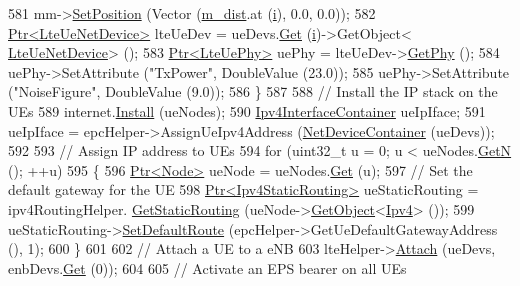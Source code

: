 \begin{DoxyCode}
581       mm->\hyperlink{classns3_1_1MobilityModel_ac584b3d5a309709d2f13ed6ada1e7640}{SetPosition} (Vector (\hyperlink{classLenaTdTbfqFfMacSchedulerTestCase2_a5b82eb9b2d7b4ce7b16fa4b9f4d67bba}{m\_dist}.at (\hyperlink{bernuolliDistribution_8m_a6f6ccfcf58b31cb6412107d9d5281426}{i}), 0.0, 0.0));
582       \hyperlink{classns3_1_1Ptr}{Ptr<LteUeNetDevice>} lteUeDev = ueDevs.\hyperlink{classns3_1_1NetDeviceContainer_a677d62594b5c9d2dea155cc5045f4d0b}{Get} (\hyperlink{bernuolliDistribution_8m_a6f6ccfcf58b31cb6412107d9d5281426}{i})->GetObject<
      \hyperlink{classns3_1_1LteUeNetDevice}{LteUeNetDevice}> ();
583       \hyperlink{classns3_1_1Ptr}{Ptr<LteUePhy>} uePhy = lteUeDev->\hyperlink{classns3_1_1LteUeNetDevice_a2a9940a1e457a8bf3dae87fed4199c7a}{GetPhy} ();
584       uePhy->SetAttribute (\textcolor{stringliteral}{"TxPower"}, DoubleValue (23.0));
585       uePhy->SetAttribute (\textcolor{stringliteral}{"NoiseFigure"}, DoubleValue (9.0));
586     \}
587 
588   \textcolor{comment}{// Install the IP stack on the UEs}
589   internet.\hyperlink{classns3_1_1InternetStackHelper_a6645b412f31283d2d9bc3d8a95cebbc0}{Install} (ueNodes);
590   \hyperlink{classns3_1_1Ipv4InterfaceContainer}{Ipv4InterfaceContainer} ueIpIface;
591   ueIpIface = epcHelper->AssignUeIpv4Address (\hyperlink{classns3_1_1NetDeviceContainer}{NetDeviceContainer} (ueDevs));
592 
593   \textcolor{comment}{// Assign IP address to UEs}
594   \textcolor{keywordflow}{for} (uint32\_t u = 0; u < ueNodes.\hyperlink{classns3_1_1NodeContainer_aed647ac56d0407a7706aba02eb44b951}{GetN} (); ++u)
595     \{
596       \hyperlink{classns3_1_1Ptr}{Ptr<Node>} ueNode = ueNodes.\hyperlink{classns3_1_1NodeContainer_a9ed96e2ecc22e0f5a3d4842eb9bf90bf}{Get} (u);
597       \textcolor{comment}{// Set the default gateway for the UE}
598       \hyperlink{classns3_1_1Ptr}{Ptr<Ipv4StaticRouting>} ueStaticRouting = ipv4RoutingHelper.
      \hyperlink{classns3_1_1Ipv4StaticRoutingHelper_a731206e50d305695dac7fb2ef963a4bb}{GetStaticRouting} (ueNode->\hyperlink{classns3_1_1Object_a13e18c00017096c8381eb651d5bd0783}{GetObject}<\hyperlink{classns3_1_1Ipv4}{Ipv4}> ());
599       ueStaticRouting->\hyperlink{classns3_1_1Ipv4StaticRouting_aee30fa3246c2b42f122dabdff2725331}{SetDefaultRoute} (epcHelper->GetUeDefaultGatewayAddress (), 1);
600     \}
601 
602   \textcolor{comment}{// Attach a UE to a eNB}
603   lteHelper->\hyperlink{classns3_1_1LteHelper_a9466743f826aa2652a87907b7f0a1c87}{Attach} (ueDevs, enbDevs.\hyperlink{classns3_1_1NetDeviceContainer_a677d62594b5c9d2dea155cc5045f4d0b}{Get} (0));
604 
605   \textcolor{comment}{// Activate an EPS bearer on all UEs}

\end{DoxyCode}

